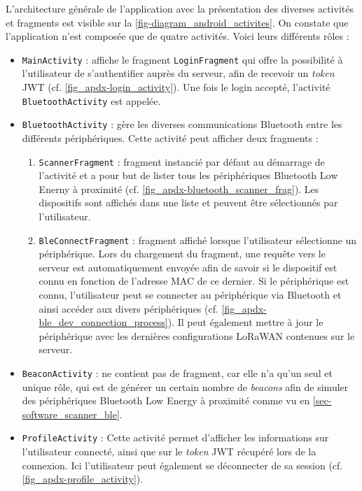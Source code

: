 L'architecture générale de l'application avec la présentation des diverses activités et fragments est visible sur la \cref{fig-diagram_android_activites}. On constate que l'application n'est composée que de quatre activités. Voici leurs différents rôles :
\begin{itemize}
    \item \texttt{MainActivity} : affiche le fragment \texttt{LoginFragment} qui offre la possibilité à l'utilisateur de s'authentifier auprès du serveur, afin de recevoir un \textit{token} JWT (cf. \cref{fig_apdx-login_activity}). Une fois le login accepté, l'activité \texttt{BluetoothActivity} est appelée.
    \item \texttt{BluetoothActivity} : gère les diverses communications Bluetooth entre les différents périphériques. Cette activité peut afficher deux fragments :
        \begin{enumerate}
            \item \texttt{ScannerFragment} : fragment instancié par défaut au démarrage de l'activité et a pour but de lister tous les périphériques Bluetooth Low Enerny à proximité (cf. \cref{fig_apdx-bluetooth_scanner_frag}). Les dispositifs sont affichés dans une liste et peuvent être sélectionnés par l'utilisateur.
            \item \texttt{BleConnectFragment} : fragment affiché lorsque l'utilisateur sélectionne un périphérique. Lors du chargement du fragment, une requête vers le serveur est automatiquement envoyée afin de savoir si le dispositif est connu en fonction de l'adresse MAC de ce dernier. Si le périphérique est connu, l'utilisateur peut se connecter au périphérique via Bluetooth et ainsi accéder aux divers périphériques (cf. \cref{fig_apdx-ble_dev_connection_process}). Il peut également mettre à jour le périphérique avec les dernières configurations LoRaWAN contenues sur le serveur.
        \end{enumerate}
    \item \texttt{BeaconActivity} : ne contient pas de fragment, car elle n'a qu'un seul et unique rôle, qui est de générer un certain nombre de \textit{beacons} afin de simuler des périphériques Bluetooth Low Energy à proximité comme vu en \cref{sec-software_scanner_ble}.
    \item \texttt{ProfileActivity} : Cette activité permet d'afficher les informations sur l'utilisateur connecté, ainsi que sur le \textit{token} JWT récupéré lors de la connexion. Ici l'utilisateur peut également se déconnecter de sa session (cf. \cref{fig_apdx-profile_activity}).
\end{itemize}



